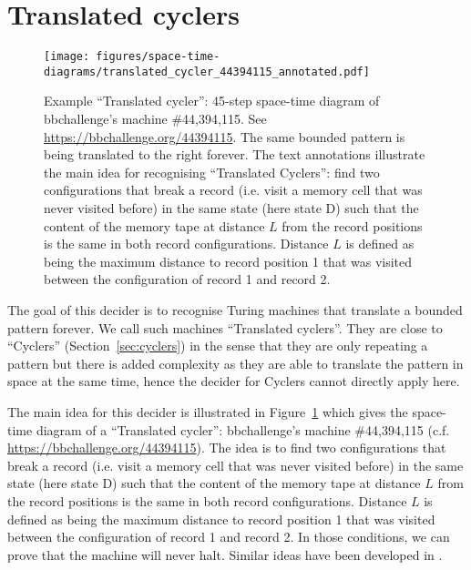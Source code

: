 
\newpage
\section{Translated cyclers}\label{sec:translated-cyclers}

\begin{figure}[h!]
  \centering
  \texttt{[image: figures/space-time-diagrams/translated\_cycler\_44394115\_annotated.pdf]}

  \caption{Example ``Translated cycler'': 45-step space-time diagram of bbchallenge's machine \#44,394,115. See \url{https://bbchallenge.org/44394115}. The same bounded pattern is being translated to the right forever. The text annotations illustrate the main idea for recognising ``Translated Cyclers'': find two configurations that break a record (i.e. visit a memory cell that was never visited before) in the same state (here state \textcolor{colorD}{D}) such that the content of the memory tape at distance $L$ from the record positions is the same in both record configurations. Distance $L$ is defined as being the maximum distance to record position 1 that was visited between the configuration of record 1 and record 2.}\label{fig:translated-cyclers}
\end{figure}

The goal of this decider is to recognise Turing machines that translate a bounded pattern forever. We call such machines ``Translated cyclers''. They are close to ``Cyclers'' (Section~\ref{sec:cyclers}) in the sense that they are only repeating a pattern but there is added complexity as they are able to translate the pattern in space at the same time, hence the decider for Cyclers cannot directly apply here.

The main idea for this decider is illustrated in Figure~\ref{fig:translated-cyclers} which gives the space-time diagram of a ``Translated cycler'': bbchallenge's machine \#44,394,115 (c.f. \url{https://bbchallenge.org/44394115}). The idea is to find two configurations that break a record (i.e. visit a memory cell that was never visited before) in the same state (here state \textcolor{colorD}{D}) such that the content of the memory tape at distance $L$ from the record positions is the same in both record configurations. Distance $L$ is defined as being the maximum distance to record position 1 that was visited between the configuration of record 1 and record 2. In those conditions, we can prove that the machine will never halt. Similar ideas have been developed in \cite{Lin1963}.

